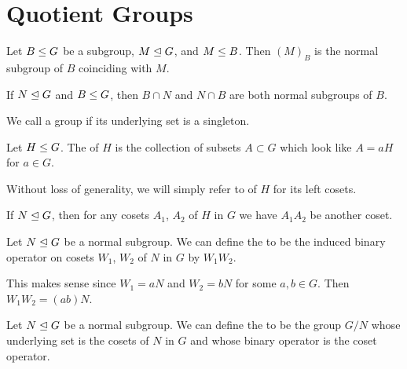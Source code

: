 \section{Quotient Groups}

\begin{definition}
Let $B\leq G$ be a subgroup, $M\trianglelefteq G$, and $M\leq B$.
Then $(M)_{B}$ is the normal subgroup of $B$ coinciding with $M$.
\end{definition}

\begin{theorem}
If $N\trianglelefteq G$ and $B\leq G$, then $B\cap N$ and $N\cap B$
are both normal subgroups of $B$.
\end{theorem}

\begin{definition}
We call a group  if its underlying set is a singleton.
\end{definition}

\begin{definition}
Let $H\leq G$. The  of $H$ is the collection of
subsets $A\subset G$ which look like $A = aH$ for $a\in G$.
\end{definition}

\begin{def-remark}
Without loss of generality, we will simply refer to  of
$H$ for its left cosets.
\end{def-remark}

\begin{theorem}
If $N\trianglelefteq G$, then for any cosets $A_{1}$, $A_{2}$ of $H$ in
$G$ we have $A_{1}A_{2}$ be another coset.
\end{theorem}

\begin{definition}
Let $N\trianglelefteq G$ be a normal subgroup. We can define the
 to be the induced binary operator on cosets
$W_{1}$, $W_{2}$ of $N$ in $G$ by $W_{1}W_{2}$.
\end{definition}

\begin{def-remark}
This makes sense since $W_{1}=aN$ and $W_{2}=bN$ for some $a,b\in G$.
Then $W_{1}W_{2}=(ab)N$.
\end{def-remark}

\begin{definition}
Let $N\trianglelefteq G$ be a normal subgroup. We can define the
 to be the group $G/N$ whose underlying set is
the cosets of $N$ in $G$ and whose binary operator is
the coset operator.
\end{definition}
